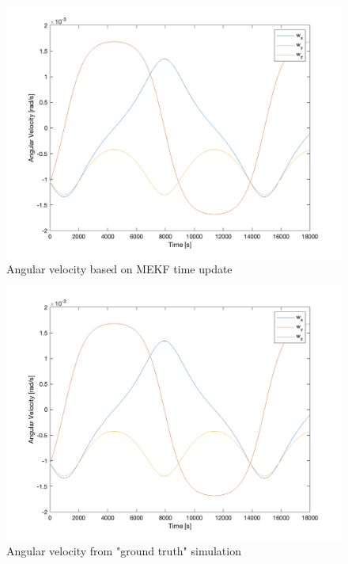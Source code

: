 \begin{figure}[H]
\centering
\includegraphics[scale=0.6]{Images/ps7_problem5a_angvel_est.png}
\caption{Angular velocity based on MEKF time update}
\label{fig:ps7_problem5a_angvel_est}
\end{figure}

\begin{figure}[H]
\centering
\includegraphics[scale=0.6]{Images/ps7_problem5a_angvel_sim.png}
\caption{Angular velocity from "ground truth" simulation}
\label{fig:ps7_problem5a_angvel_sim}
\end{figure}

